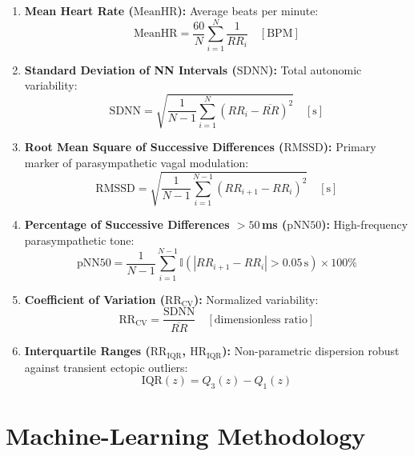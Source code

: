 \documentclass[conference]{IEEEtran}
\begin{document}
\begin{enumerate}
    \item \textbf{Mean Heart Rate ($\text{MeanHR}$):} Average beats per minute:
    \begin{equation}
        \text{MeanHR} = \frac{60}{N} \sum_{i=1}^{N} \frac{1}{RR_i} \quad [\text{BPM}]
    \end{equation}
    \item \textbf{Standard Deviation of NN Intervals ($\text{SDNN}$):} Total autonomic variability:
    \begin{equation}
        \text{SDNN} = \sqrt{\frac{1}{N-1} \sum_{i=1}^{N} (RR_i - \overline{RR})^2} \quad [\text{s}]
    \end{equation}
    \item \textbf{Root Mean Square of Successive Differences ($\text{RMSSD}$):} Primary marker of parasympathetic vagal modulation:
    \begin{equation}
        \text{RMSSD} = \sqrt{\frac{1}{N-1} \sum_{i=1}^{N-1} (RR_{i+1} - RR_i)^2} \quad [\text{s}]
    \end{equation}
    \item \textbf{Percentage of Successive Differences $> 50$\,ms ($\text{pNN50}$):} High-frequency parasympathetic tone:
    \begin{equation}
        \text{pNN50} = \frac{1}{N-1} \sum_{i=1}^{N-1} \mathbb{I}(|RR_{i+1} - RR_i| > 0.05\,\text{s}) \times 100\%
    \end{equation}
    \item \textbf{Coefficient of Variation ($\text{RR}_{\text{CV}}$):} Normalized variability:
    \begin{equation}
        \text{RR}_{\text{CV}} = \frac{\text{SDNN}}{\overline{RR}} \quad [\text{dimensionless ratio}]
    \end{equation}
    \item \textbf{Interquartile Ranges ($\text{RR}_{\text{IQR}}$, $\text{HR}_{\text{IQR}}$):} Non-parametric dispersion robust against transient ectopic outliers:
    \begin{equation}
        \text{IQR}(z) = Q_3(z) - Q_1(z)
    \end{equation}
\end{enumerate}

\section{Machine-Learning Methodology}
\label{sec:ml_methodology}
\end{document}
